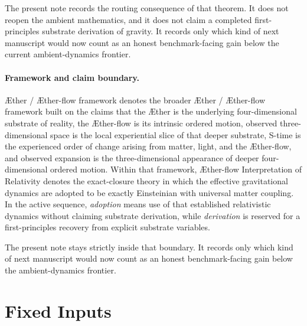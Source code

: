 \documentclass[11pt]{article}
\newcommand{\Aether}{\AE{}ther}
\newcommand{\Aflow}{\AE{}ther-flow}
\newcommand{\TheoryName}{\Aflow{} Interpretation of Relativity}
\newcommand{\TheoryProgram}{\Aether{} / \Aflow{} framework}
\begin{document}
The present note records the routing consequence of that theorem. It does not reopen the ambient mathematics, and it does not claim a completed first-principles substrate derivation of gravity. It records only which kind of next manuscript would now count as an honest benchmark-facing gain below the current ambient-dynamics frontier.

\paragraph{Framework and claim boundary.}
\TheoryProgram{} denotes the broader \Aether{} / \Aflow{} framework built on the claims that the \Aether{} is the underlying four-dimensional substrate of reality, the \Aflow{} is its intrinsic ordered motion, observed three-dimensional space is the local experiential slice of that deeper substrate, S-time is the experienced order of change arising from matter, light, and the \Aflow{}, and observed expansion is the three-dimensional appearance of deeper four-dimensional ordered motion. Within that framework, \TheoryName{} denotes the exact-closure theory in which the effective gravitational dynamics are adopted to be exactly Einsteinian with universal matter coupling. In the active sequence, \emph{adoption} means use of that established relativistic dynamics without claiming substrate derivation, while \emph{derivation} is reserved for a first-principles recovery from explicit substrate variables.

The present note stays strictly inside that boundary. It records only which kind of next manuscript would now count as an honest benchmark-facing gain below the ambient-dynamics frontier.

\section{Fixed Inputs}
\end{document}
